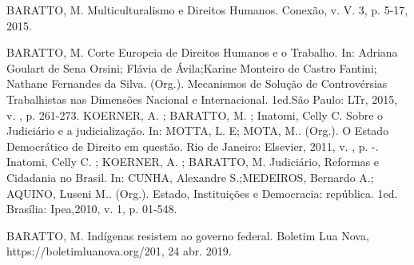 

\begin{cvcitems}
  \cvcitem
    {BARATTO, M.}
    {Multiculturalismo e Direitos Humanos. Conexão, v. V. 3, p. 5-17, 2015.}
\end{cvcitems}



\begin{cvcitems}
  \cvcitem
    {BARATTO, M.}
    {Corte Europeia de Direitos Humanos e o Trabalho. In: Adriana Goulart de Sena Orsini; Flávia de Ávila;Karine Monteiro de Castro Fantini; Nathane Fernandes da Silva. (Org.). Mecanismos de Solução de Controvérsias Trabalhistas nas Dimensões Nacional e Internacional. 1ed.São Paulo: LTr, 2015, v. , p. 261-273.}
  \cvcitem
    {KOERNER, A. ; BARATTO, M. ; Inatomi, Celly C.}
    {Sobre o Judiciário e a judicialização. In: MOTTA, L. E; MOTA, M.. (Org.). O Estado Democrático de Direito em questão. Rio de Janeiro: Elsevier, 2011, v. , p. -.}
  \cvcitem
    {Inatomi, Celly C. ; KOERNER, A. ; BARATTO, M.}
    {Judiciário, Reformas e Cidadania no Brasil. In: CUNHA, Alexandre S.;MEDEIROS, Bernardo A.; AQUINO, Luseni M.. (Org.). Estado, Instituições e Democracia: república. 1ed. Brasília: Ipea,2010, v. 1, p. 01-548.}
\end{cvcitems}


\begin{cvcitems}
  \cvcitem
    {BARATTO, M.}
    {Indígenas resistem ao governo federal. Boletim Lua Nova, https://boletimluanova.org/201, 24 abr. 2019.}
\end{cvcitems}


